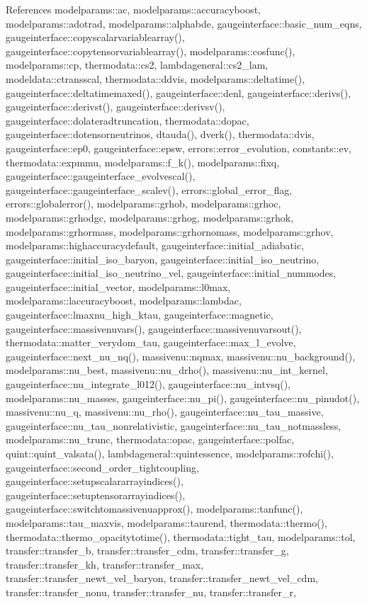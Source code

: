 References modelparams\+::ac, modelparams\+::accuracyboost, modelparams\+::adotrad, modelparams\+::alphabde, gaugeinterface\+::basic\+\_\+num\+\_\+eqns, gaugeinterface\+::copyscalarvariablearray(), gaugeinterface\+::copytensorvariablearray(), modelparams\+::cosfunc(), modelparams\+::cp, thermodata\+::cs2, lambdageneral\+::cs2\+\_\+lam, modeldata\+::ctransscal, thermodata\+::ddvis, modelparams\+::deltatime(), gaugeinterface\+::deltatimemaxed(), gaugeinterface\+::denl, gaugeinterface\+::derivs(), gaugeinterface\+::derivst(), gaugeinterface\+::derivsv(), gaugeinterface\+::dolateradtruncation, thermodata\+::dopac, gaugeinterface\+::dotensorneutrinos, dtauda(), dverk(), thermodata\+::dvis, gaugeinterface\+::ep0, gaugeinterface\+::epsw, errors\+::error\+\_\+evolution, constants\+::ev, thermodata\+::expmmu, modelparams\+::f\+\_\+k(), modelparams\+::fixq, gaugeinterface\+::gaugeinterface\+\_\+evolvescal(), gaugeinterface\+::gaugeinterface\+\_\+scalev(), errors\+::global\+\_\+error\+\_\+flag, errors\+::globalerror(), modelparams\+::grhob, modelparams\+::grhoc, modelparams\+::grhodgc, modelparams\+::grhog, modelparams\+::grhok, modelparams\+::grhormass, modelparams\+::grhornomass, modelparams\+::grhov, modelparams\+::highaccuracydefault, gaugeinterface\+::initial\+\_\+adiabatic, gaugeinterface\+::initial\+\_\+iso\+\_\+baryon, gaugeinterface\+::initial\+\_\+iso\+\_\+neutrino, gaugeinterface\+::initial\+\_\+iso\+\_\+neutrino\+\_\+vel, gaugeinterface\+::initial\+\_\+nummodes, gaugeinterface\+::initial\+\_\+vector, modelparams\+::l0max, modelparams\+::laccuracyboost, modelparams\+::lambdac, gaugeinterface\+::lmaxnu\+\_\+high\+\_\+ktau, gaugeinterface\+::magnetic, gaugeinterface\+::massivenuvars(), gaugeinterface\+::massivenuvarsout(), thermodata\+::matter\+\_\+verydom\+\_\+tau, gaugeinterface\+::max\+\_\+l\+\_\+evolve, gaugeinterface\+::next\+\_\+nu\+\_\+nq(), massivenu\+::nqmax, massivenu\+::nu\+\_\+background(), modelparams\+::nu\+\_\+best, massivenu\+::nu\+\_\+drho(), massivenu\+::nu\+\_\+int\+\_\+kernel, gaugeinterface\+::nu\+\_\+integrate\+\_\+l012(), gaugeinterface\+::nu\+\_\+intvsq(), modelparams\+::nu\+\_\+masses, gaugeinterface\+::nu\+\_\+pi(), gaugeinterface\+::nu\+\_\+pinudot(), massivenu\+::nu\+\_\+q, massivenu\+::nu\+\_\+rho(), gaugeinterface\+::nu\+\_\+tau\+\_\+massive, gaugeinterface\+::nu\+\_\+tau\+\_\+nonrelativistic, gaugeinterface\+::nu\+\_\+tau\+\_\+notmassless, modelparams\+::nu\+\_\+trunc, thermodata\+::opac, gaugeinterface\+::polfac, quint\+::quint\+\_\+valsata(), lambdageneral\+::quintessence, modelparams\+::rofchi(), gaugeinterface\+::second\+\_\+order\+\_\+tightcoupling, gaugeinterface\+::setupscalararrayindices(), gaugeinterface\+::setuptensorarrayindices(), gaugeinterface\+::switchtomassivenuapprox(), modelparams\+::tanfunc(), modelparams\+::tau\+\_\+maxvis, modelparams\+::taurend, thermodata\+::thermo(), thermodata\+::thermo\+\_\+opacitytotime(), thermodata\+::tight\+\_\+tau, modelparams\+::tol, transfer\+::transfer\+\_\+b, transfer\+::transfer\+\_\+cdm, transfer\+::transfer\+\_\+g, transfer\+::transfer\+\_\+kh, transfer\+::transfer\+\_\+max, transfer\+::transfer\+\_\+newt\+\_\+vel\+\_\+baryon, transfer\+::transfer\+\_\+newt\+\_\+vel\+\_\+cdm, transfer\+::transfer\+\_\+nonu, transfer\+::transfer\+\_\+nu, transfer\+::transfer\+\_\+r, 